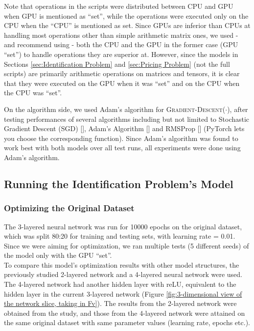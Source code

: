 \documentclass[12pt]{article}
\begin{document}
    Note that operations in the scripts were distributed between CPU and GPU when GPU is mentioned as ``set'', while the operations were executed only on the CPU when the ``CPU'' is mentioned as set. Since GPUs are inferior than CPUs at handling most operations other than simple arithmetic matrix ones, we used - and recommend using - both the CPU and the GPU in the former case (GPU ``set'') to handle operations they are superior at. However, since the models in Sections \ref{sec:Identification Problem} and \ref{sec:Pricing Problem} (not the full scripts) are primarily arithmetic operations on matrices and tensors, it is clear that they were executed on the GPU when it was ``set'' and on the CPU when the CPU was ``set''.
    
    On the algorithm side, we used Adam's algorithm for \textsc{Gradient-Descent}($\cdot$), after testing performances of several algorithms including but not limited to Stochastic Gradient Descent (SGD) [], Adam's Algorithm [] and RMSProp [] (PyTorch lets you choose the corresponding function). Since Adam's algorithm was found to work best with both models over all test runs, all experiments were done using Adam's algorithm.
    
    \subsection{Running the Identification Problem's Model}
    \subsubsection{Optimizing the Original Dataset}
    The 3-layered neural network was run for 10000 epochs on the original dataset, which was split 80:20 for training and testing sets, with learning rate = 0.01. Since we were aiming for optimization, we ran multiple tests (5 different seeds) of the model only with the GPU ``set''.\\
    
    To compare this model's optimization results with other model structures, the previously studied 2-layered network \cite{Xue2016Avi2} and a 4-layered neural network were used. The 4-layered network had another hidden layer with reLU, equivalent to the hidden layer in the current 3-layered network (Figure \ref{fig:3-dimensional view of the network slice, taking in Fv}). The results from the 2-layered network were obtained from the study, and those from the 4-layered network were attained on the same original dataset with same parameter values (learning rate, epochs etc.).
    
\end{document}
